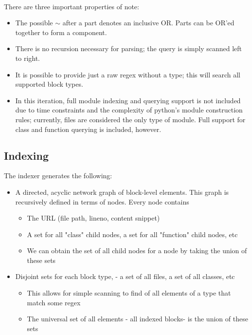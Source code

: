 \documentclass{article}
\begin{document}
\paragraph{}
There are three important properties of note:
	\begin{itemize}
	\item The possible $\sim$ after a part denotes an inclusive OR. Parts can be OR'ed together to form a component.
    \item There is no recursion necessary for parsing; the query is simply scanned left to right.
   	\item It is possible to provide just a raw regex without a type; this will search all supported block types.
    \item In this iteration, full module indexing and querying support is not included due to time constraints and the complexity of python's module construction rules; currently, files are considered the only type of module. Full support for class and function querying is included, however.
	\end{itemize}
	
\subsection{Indexing}
The indexer generates the following:
	\begin{itemize}
	\item A directed, acyclic network graph of block-level elements. This graph is recursively defined in terms of nodes. Every node contains
       \begin{itemize} 
       	\item The URL (file path, lineno, content snippet)
        \item A set for all "class" child nodes, a set for all "function" child nodes, etc
        \item We can obtain the set of all child nodes for a node by taking the union of these sets
       \end{itemize}
    \item Disjoint sets for each block type, - a set of all files, a set of all classes, etc
    	\begin{itemize}
    	\item This allows for simple scanning to find of all elements of a type that match some regex
    	\item The universal set of all elements - all indexed blocks- is the union of these sets
    	\end{itemize}
	\end{itemize}
\end{document}
